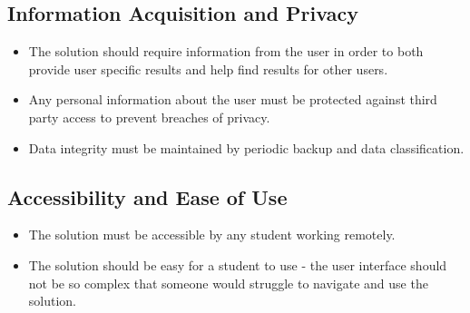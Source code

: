 \documentclass[11pt]{article}
\newenvironment{subs}
  {\adjustwidth{3em}{0pt}}
  {\endadjustwidth}
\begin{document}
\begin{subs}
        \subsection{Information Acquisition and Privacy}
        \begin{itemize}
            \item The solution should require information from the user in order to both provide user specific results and help find results for other users. 
            \item Any personal information about the user must be protected against third party access to prevent breaches of privacy.
            \item Data integrity must be maintained by periodic backup and data classification.
        \end{itemize} 
        \subsection{Accessibility and Ease of Use}
        \begin{itemize}
            \item The solution must be accessible by any student working remotely.
            \item The solution should be easy for a student to use - the user interface should not be so complex that someone would struggle to navigate and use the solution.
        \end{itemize}
    \end{subs}
\end{document}
